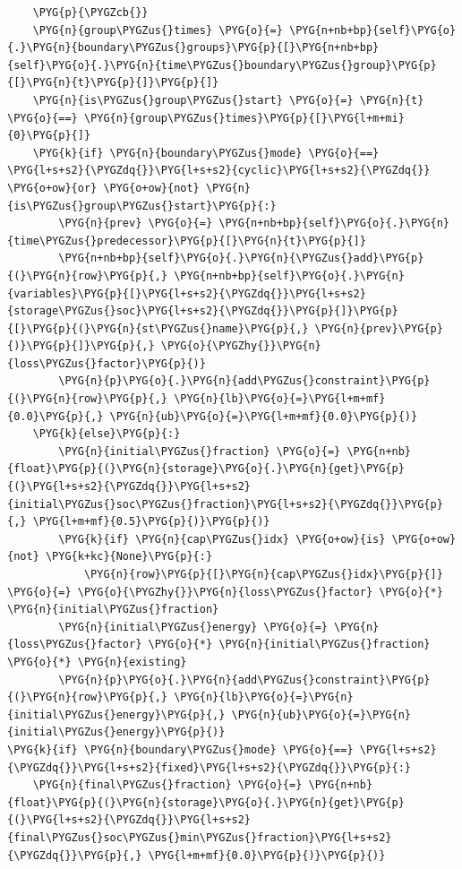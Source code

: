 \begin{Verbatim}
    \PYG{p}{\PYGZcb{}}
    \PYG{n}{group\PYGZus{}times} \PYG{o}{=} \PYG{n+nb+bp}{self}\PYG{o}{.}\PYG{n}{boundary\PYGZus{}groups}\PYG{p}{[}\PYG{n+nb+bp}{self}\PYG{o}{.}\PYG{n}{time\PYGZus{}boundary\PYGZus{}group}\PYG{p}{[}\PYG{n}{t}\PYG{p}{]}\PYG{p}{]}
    \PYG{n}{is\PYGZus{}group\PYGZus{}start} \PYG{o}{=} \PYG{n}{t} \PYG{o}{==} \PYG{n}{group\PYGZus{}times}\PYG{p}{[}\PYG{l+m+mi}{0}\PYG{p}{]}
    \PYG{k}{if} \PYG{n}{boundary\PYGZus{}mode} \PYG{o}{==} \PYG{l+s+s2}{\PYGZdq{}}\PYG{l+s+s2}{cyclic}\PYG{l+s+s2}{\PYGZdq{}} \PYG{o+ow}{or} \PYG{o+ow}{not} \PYG{n}{is\PYGZus{}group\PYGZus{}start}\PYG{p}{:}
        \PYG{n}{prev} \PYG{o}{=} \PYG{n+nb+bp}{self}\PYG{o}{.}\PYG{n}{time\PYGZus{}predecessor}\PYG{p}{[}\PYG{n}{t}\PYG{p}{]}
        \PYG{n+nb+bp}{self}\PYG{o}{.}\PYG{n}{\PYGZus{}add}\PYG{p}{(}\PYG{n}{row}\PYG{p}{,} \PYG{n+nb+bp}{self}\PYG{o}{.}\PYG{n}{variables}\PYG{p}{[}\PYG{l+s+s2}{\PYGZdq{}}\PYG{l+s+s2}{storage\PYGZus{}soc}\PYG{l+s+s2}{\PYGZdq{}}\PYG{p}{]}\PYG{p}{[}\PYG{p}{(}\PYG{n}{st\PYGZus{}name}\PYG{p}{,} \PYG{n}{prev}\PYG{p}{)}\PYG{p}{]}\PYG{p}{,} \PYG{o}{\PYGZhy{}}\PYG{n}{loss\PYGZus{}factor}\PYG{p}{)}
        \PYG{n}{p}\PYG{o}{.}\PYG{n}{add\PYGZus{}constraint}\PYG{p}{(}\PYG{n}{row}\PYG{p}{,} \PYG{n}{lb}\PYG{o}{=}\PYG{l+m+mf}{0.0}\PYG{p}{,} \PYG{n}{ub}\PYG{o}{=}\PYG{l+m+mf}{0.0}\PYG{p}{)}
    \PYG{k}{else}\PYG{p}{:}
        \PYG{n}{initial\PYGZus{}fraction} \PYG{o}{=} \PYG{n+nb}{float}\PYG{p}{(}\PYG{n}{storage}\PYG{o}{.}\PYG{n}{get}\PYG{p}{(}\PYG{l+s+s2}{\PYGZdq{}}\PYG{l+s+s2}{initial\PYGZus{}soc\PYGZus{}fraction}\PYG{l+s+s2}{\PYGZdq{}}\PYG{p}{,} \PYG{l+m+mf}{0.5}\PYG{p}{)}\PYG{p}{)}
        \PYG{k}{if} \PYG{n}{cap\PYGZus{}idx} \PYG{o+ow}{is} \PYG{o+ow}{not} \PYG{k+kc}{None}\PYG{p}{:}
            \PYG{n}{row}\PYG{p}{[}\PYG{n}{cap\PYGZus{}idx}\PYG{p}{]} \PYG{o}{=} \PYG{o}{\PYGZhy{}}\PYG{n}{loss\PYGZus{}factor} \PYG{o}{*} \PYG{n}{initial\PYGZus{}fraction}
        \PYG{n}{initial\PYGZus{}energy} \PYG{o}{=} \PYG{n}{loss\PYGZus{}factor} \PYG{o}{*} \PYG{n}{initial\PYGZus{}fraction} \PYG{o}{*} \PYG{n}{existing}
        \PYG{n}{p}\PYG{o}{.}\PYG{n}{add\PYGZus{}constraint}\PYG{p}{(}\PYG{n}{row}\PYG{p}{,} \PYG{n}{lb}\PYG{o}{=}\PYG{n}{initial\PYGZus{}energy}\PYG{p}{,} \PYG{n}{ub}\PYG{o}{=}\PYG{n}{initial\PYGZus{}energy}\PYG{p}{)}
\PYG{k}{if} \PYG{n}{boundary\PYGZus{}mode} \PYG{o}{==} \PYG{l+s+s2}{\PYGZdq{}}\PYG{l+s+s2}{fixed}\PYG{l+s+s2}{\PYGZdq{}}\PYG{p}{:}
    \PYG{n}{final\PYGZus{}fraction} \PYG{o}{=} \PYG{n+nb}{float}\PYG{p}{(}\PYG{n}{storage}\PYG{o}{.}\PYG{n}{get}\PYG{p}{(}\PYG{l+s+s2}{\PYGZdq{}}\PYG{l+s+s2}{final\PYGZus{}soc\PYGZus{}min\PYGZus{}fraction}\PYG{l+s+s2}{\PYGZdq{}}\PYG{p}{,} \PYG{l+m+mf}{0.0}\PYG{p}{)}\PYG{p}{)}

\end{Verbatim}

